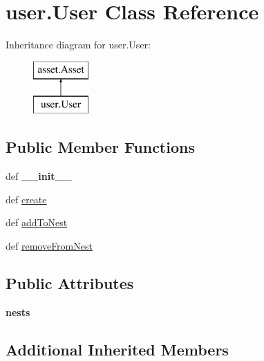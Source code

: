 \hypertarget{classuser_1_1_user}{\section{user.\-User Class Reference}
\label{classuser_1_1_user}
}
Inheritance diagram for user.\-User\-:\begin{figure}[H]
\begin{center}
\leavevmode
\includegraphics[height=2.000000cm]{classuser_1_1_user}
\end{center}
\end{figure}
\subsection*{Public Member Functions}
\begin{DoxyCompactItemize}
\item 
\hypertarget{classuser_1_1_user_af37c1e601519fef697f986c3334e0bf0}{def {\bfseries \-\_\-\-\_\-init\-\_\-\-\_\-}}\label{classuser_1_1_user_af37c1e601519fef697f986c3334e0bf0}

\item 
def \hyperlink{classuser_1_1_user_a537f4e3e8b43f40882b9b149e7adca2e}{create}
\item 
def \hyperlink{classuser_1_1_user_a05d0ea577c0ad94aa421dc9628de1de3}{add\-To\-Nest}
\item 
def \hyperlink{classuser_1_1_user_aba91ed6ad12bbb77b77bbc0fe6bba953}{remove\-From\-Nest}
\end{DoxyCompactItemize}
\subsection*{Public Attributes}
\begin{DoxyCompactItemize}
\item 
\hypertarget{classuser_1_1_user_ac6ba5d5b3449c476080ddcf1397ac104}{{\bfseries nests}}\label{classuser_1_1_user_ac6ba5d5b3449c476080ddcf1397ac104}

\end{DoxyCompactItemize}
\subsection*{Additional Inherited Members}


